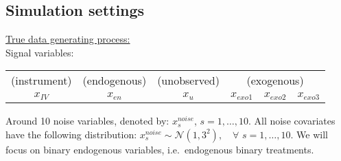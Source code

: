 \documentclass[12pt]{article}
\begin{document}
\subsection*{Simulation settings}
\underline{True data generating process:}\\
Signal variables:
\begin{center}
\begin{tabular}{cccc}
(instrument) & (endogenous) & (unobserved) & \quad (exogenous) \\
$x_{IV}$ &  $x_{en}$ & $x_{u}$ & $x_{exo1} \quad x_{exo2} \quad x_{exo3}$ 
\end{tabular}
\end{center}

Around 10 noise variables, denoted by: $x^{noise}_s$, $s = 1, \dots, 10$. All noise covariates have the following distribution: $x^{noise}_s \sim \mathcal{N}(1,3^2), \quad \forall$ $s = 1,\dots, 10.$
We will focus on binary endogenous variables, i.e.\ endogenous binary treatments.
\end{document}
